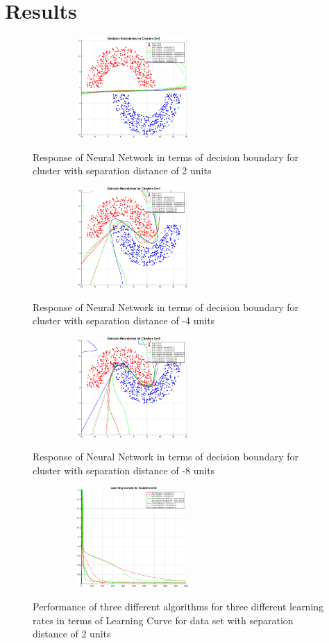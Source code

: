 \documentclass[conference]{IEEEtran}
\begin{document}
\section{Results}
\begin{figure}[h!]
\centering
{\includegraphics[width=3in,height=1.5in,clip,keepaspectratio]{Exp1_DB2.eps} }\\
\caption{Response of Neural Network in terms of decision boundary for cluster with separation distance of 2 units }
\end{figure}
\begin{figure}[h!]
\centering
{\includegraphics[width=3in,height=1.5in,clip,keepaspectratio]{Exp1_DBn4.eps} }\\
\caption{Response of Neural Network in terms of decision boundary for cluster with separation distance of -4 units}
\end{figure}
\begin{figure}[h!]
\centering
{\includegraphics[width=3in,height=1.5in,clip,keepaspectratio]{Exp1_DBn8.eps} }\\
\caption{Response of Neural Network in terms of decision boundary for cluster with separation distance of -8 units}
\end{figure}
\begin{figure}[h!]
\centering
{\includegraphics[width=3in,height=1.5in,clip,keepaspectratio]{Exp1_LC2.eps} }
\caption{Performance of three different algorithms for three different learning rates in terms of Learning Curve for data set with separation distance of 2 units }
\end{figure}
\end{document}
